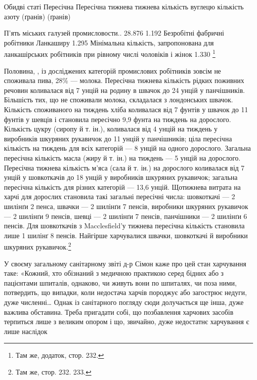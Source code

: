 \parcont{}  %
Обидві статі                                                        Пересічна
       Пересічна
                                                                                тижнева
                    тижнева
                                                                                кількість вуглецю
            кількість азоту
                                                                                (ґранів)
                      (ґранів)

П’ять міських галузей промисловости..     28.876                                      1.192
Безробітні фабричні робітники
Ланкаширу
1.295
Мінімальна кількість, запропонована
для ланкашірських робітників при
рівному числі чоловіків і жінок                                      1.330
\footnote{
Там же, додаток, стор. 232.
}

Половина, , із досліджених категорій промислових робітників
зовсім не споживала пива, 28\% — молока. Пересічна
тижнева кількість рідких поживних речовин коливалася від
7 унцій на родину в швачок до 24 унцій у панчішників. Більшість
тих, що не споживали молока, складалася з лондонських
швачок. Кількість споживаного на тиждень хліба коливалася
від 7 фунтів у швачок до 11 фунтів у шевців і становила пересічно
9,9 фунта на тиждень на дорослого. Кількість цукру (сиропу
й т. ін.), коливалася від 4 унцій на тиждень у виробників
шкуряних рукавичок до 11 унцій у панчішників; ціла пересічна
кількість на тиждень для всіх категорій — 8 унцій на одного
дорослого. Загальна пересічна кількість масла (жиру й т. ін.)
на тиждень — 5 унцій на дорослого. Пересічна тижнева кількість
м’яса (сала й т. ін.) на дорослого коливалася від 7 унцій у шовкоткачів
до 18 унцій у виробників шкуряних рукавичок;
загальна пересічна кількість для різних категорій — 13,6 унцій.
Щотижнева витрата на харчі для дорослих становила такі загальні
пересічні числа: шовкоткачі — 2 шилінґи 2 пенса,
швачки — 2 шилінґи 7 пенсів, виробники шкуряних рукавичок
— 2 шилінґи 9 пенсів, шевці — 2 шилінґи 7 пенсів,
панчішники — 2 шилінґи 6 пенсів. Для шовкоткачів з Macclesfield’у
тижнева пересічна кількість становила лише 1 шилінґ
8 пенсів. Найгірше харчувалися швачки, шовкоткачі й виробники
шкуряних рукавичок.\footnote{
Там же, стор. 232. 233.
}

У своєму загальному санітарному звіті д-р Сімон каже про
цей стан харчування таке: «Кожний, хто обізнаний з медичною
практикою серед бідних або з пацієнтами шпиталів, однаково,
чи живуть вони по шпиталях, чи поза ними, потвердить, що випадки,
коли недостача харчів породжує або загострює недуги,
дуже численні\dots{} Однак із санітарного погляду сюди долучається
ще інша, дуже важлива обставина. Треба пригадати собі, що
позбавлення харчових засобів терпиться лише з великим опором
і що, звичайно, дуже недостатнє харчування є лише наслідок
\parbreak{}  %
